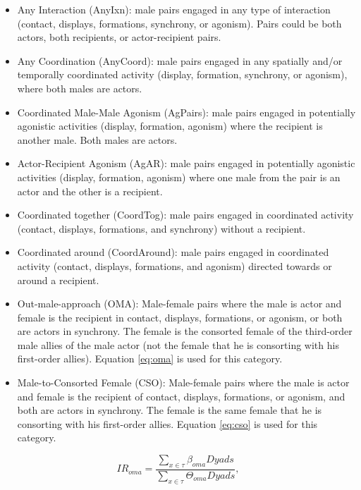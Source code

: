 \documentclass[11pt]{amsart}
\begin{document}
\begin{itemize}
\item Any Interaction (AnyIxn): male pairs engaged in any type of interaction (contact, displays, formations, synchrony, or agonism). Pairs could be both actors, both recipients, or actor-recipient pairs.
\item Any Coordination (AnyCoord): male pairs engaged in any spatially and/or temporally coordinated activity (display, formation, synchrony, or agonism), where both males are actors. 
\item Coordinated Male-Male Agonism (AgPairs): male pairs engaged in potentially agonistic activities (display, formation, agonism) where the recipient is another male. Both males are actors.
\item Actor-Recipient Agonism (AgAR): male pairs engaged in potentially agonistic activities (display, formation, agonism) where one male from the pair is an actor and the other is a recipient.
\item Coordinated together (CoordTog): male pairs engaged in coordinated activity (contact, displays, formations, and synchrony) without a recipient. 
\item Coordinated around (CoordAround): male pairs engaged in coordinated activity (contact, displays, formations, and agonism) directed towards or around a recipient.
\item Out-male-approach (OMA): Male-female pairs where the male is actor and female is the recipient in contact, displays, formations, or agonism, or both are actors in synchrony. The female is the consorted female of the third-order male allies of the male actor (not the female that he is consorting with his first-order allies). Equation \ref{eq:oma} is used for this category. 
\item Male-to-Consorted Female (CSO): Male-female pairs where the male is actor and female is the recipient of contact, displays, formations, or agonism, and both are actors in synchrony. The female is the same female that he is consorting with his first-order allies. Equation \ref{eq:cso} is used for this category. 
\end{itemize}


\begin{equation} \label{eq:oma}
IR_{oma} = \frac{\sum\limits_{x \in \tau} \beta_{oma}{Dyads}}{\sum\limits_{x \in \tau} \Theta_{oma}{Dyads}},
\end{equation}
\end{document}
